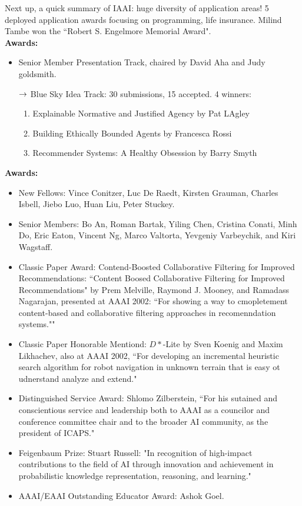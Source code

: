 Next up, a quick summary of IAAI: huge diversity of application areas! 5 deployed application awards focusing on programming, life insurance. Milind Tambe won the ``Robert S. Engelmore Memorial Award". \\

{\bf Awards:}
\begin{itemize}
    \item Senior Member Presentation Track, chaired by David Aha and Judy goldsmith.

    $\rightarrow$ Blue Sky Idea Track: 30 submissions, 15 accepted. 4 winners:
    
        \begin{enumerate}
        \item Explainable Normative and Justified Agency by Pat LAgley
        \item Building Ethically Bounded Agents by Francesca Rossi
        \item Recommender Systems: A Healthy Obsession by Barry Smyth
        \end{enumerate}
    
\end{itemize}

{\bf Awards:}
\begin{itemize}
\item New Fellows: Vince Conitzer, Luc De Raedt, Kirsten Grauman, Charles Isbell, Jiebo Luo, Huan Liu, Peter Stuckey.
\item Senior Members: Bo An, Roman Bartak, Yiling Chen, Cristina Conati, Minh Do, Eric Eaton, Vincent Ng, Marco Valtorta, Yevgeniy Varbeychik, and Kiri Wagstaff.

\item Classic Paper Award: Contend-Boosted Collaborative Filtering for Improved Recommendations: ``Content Boosed Collaborative Filtering for Improved Recommendations" by Prem Melville, Raymond J. Mooney, and Ramadass Nagarajan, presented at AAAI 2002: ``For showing a way to cmopletement content-based and collaborative filtering approaches in recomenndation systems.""

\item Classic Paper Honorable Mentiond: $D*$-Lite by Sven Koenig and Maxim Likhachev, also at AAAI 2002, ``For developing an incremental heuristic search algorithm for robot navigation in unknown terrain that is easy ot udnerstand analyze and extend."

\item Distinguished Service Award: Shlomo Zilberstein, ``For his sutained and conscientious service and leadership both to AAAI as a councilor and conference committee chair and to the broader AI community, as the president of ICAPS."

\item Feigenbaum Prize: Stuart Russell: "In recognition of high-impact contributions to the field of AI through innovation and achievement in probabilistic knowledge representation, reasoning, and learning."

\item AAAI/EAAI Outstanding Educator Award: Ashok Goel.
\end{itemize}


